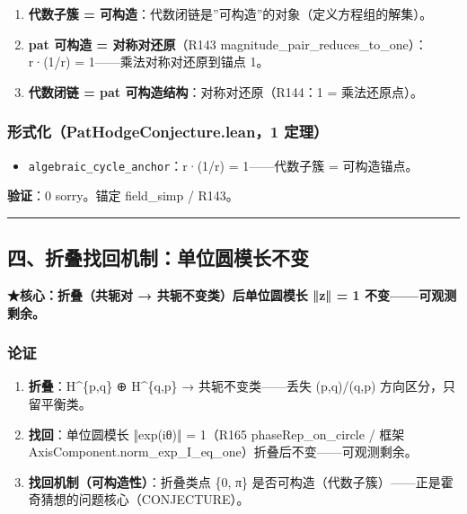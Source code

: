 \documentclass[
]{article}
\providecommand{\tightlist}{%
  \setlength{\itemsep}{0pt}\setlength{\parskip}{0pt}}
\begin{document}
\begin{enumerate}
\def\labelenumi{\arabic{enumi}.}
\tightlist
\item
  \textbf{代数子簇 =
  可构造}：代数闭链是''可构造''的对象（定义方程组的解集）。
\item
  \textbf{pat 可构造 = 对称对还原}（R143
  magnitude\_pair\_reduces\_to\_one）：r·(1/r) =
  1------乘法对称对还原到锚点 1。
\item
  \textbf{代数闭链 = pat 可构造结构}：对称对还原（R144：1 =
  乘法还原点）。
\end{enumerate}

\subsubsection{形式化（PatHodgeConjecture.lean，1
定理）}\label{ux5f62ux5f0fux5316pathodgeconjecture.lean1-ux5b9aux7406-2}

\begin{itemize}
\tightlist
\item
  \texttt{algebraic\_cycle\_anchor}：r·(1/r) = 1------代数子簇 =
  可构造锚点。
\end{itemize}

\textbf{验证}：0 sorry。锚定 field\_simp / R143。

\begin{center}\rule{0.5\linewidth}{0.5pt}\end{center}

\subsection{四、折叠找回机制：单位圆模长不变}\label{ux56dbux6298ux53e0ux627eux56deux673aux5236ux5355ux4f4dux5706ux6a21ux957fux4e0dux53d8}

\textbf{★核心：折叠（共轭对 → 共轭不变类）后单位圆模长 ‖z‖ = 1
不变------可观测剩余。}

\subsubsection{论证}\label{ux8bbaux8bc1-3}

\begin{enumerate}
\def\labelenumi{\arabic{enumi}.}
\tightlist
\item
  \textbf{折叠}：H\^{}\{p,q\} ⊕ H\^{}\{q,p\} → 共轭不变类------丢失
  (p,q)/(q,p) 方向区分，只留平衡类。
\item
  \textbf{找回}：单位圆模长 ‖exp(iθ)‖ = 1（R165 phaseRep\_on\_circle /
  框架 AxisComponent.norm\_exp\_I\_eq\_one）折叠后不变------可观测剩余。
\item
  \textbf{找回机制（可构造性）}：折叠类点 \{0, π\}
  是否可构造（代数子簇）------正是霍奇猜想的问题核心（CONJECTURE）。
\end{enumerate}
\end{document}
